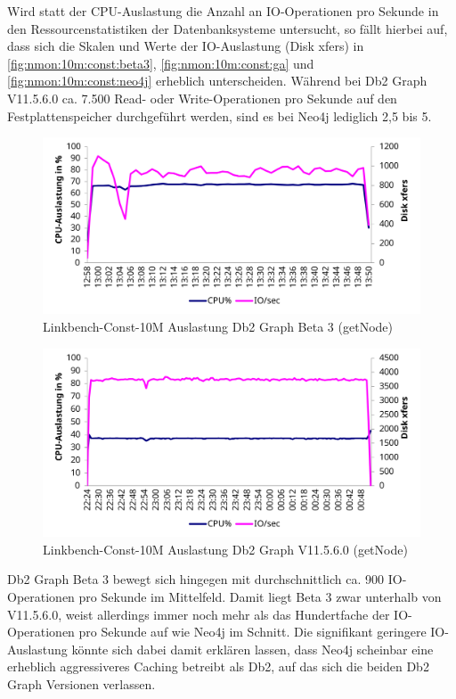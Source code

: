 Wird statt der CPU-Auslastung die Anzahl an IO-Ope\-ra\-ti\-on\-en pro Sekunde in den Ressourcenstatistiken der Datenbanksysteme untersucht, so fällt hierbei auf, dass sich die Skalen und Werte der IO-Aus\-last\-ung (Disk xfers) in \autoref{fig:nmon:10m:const:beta3}, \autoref{fig:nmon:10m:const:ga} und \autoref{fig:nmon:10m:const:neo4j} erheblich unterscheiden. Während bei Db2 Graph V11.5.6.0 ca. 7.500 Read- oder Write-Ope\-ra\-ti\-on\-en pro Sekunde auf den Festplattenspeicher durchgeführt werden, sind es bei Neo4j lediglich 2,5 bis 5. 
\begin{figure}[!ht]
    \centering
    \includegraphics[width=\textwidth]{images/stats/linkbench-10m-const_beta3.pdf}
    \caption{Linkbench-Const-10M Auslastung Db2 Graph Beta 3 (getNode)}
    \label{fig:nmon:10m:const:beta3}
\end{figure}

\begin{figure}[!ht]
    \centering
    \includegraphics[width=\textwidth]{images/stats/linkbench-10m-const_ga.pdf}
    \caption{Linkbench-Const-10M Auslastung Db2 Graph V11.5.6.0 (getNode)}
    \label{fig:nmon:10m:const:ga}
\end{figure}

Db2 Graph Beta 3 bewegt sich hingegen mit durchschnittlich ca. 900 IO-Ope\-ra\-ti\-on\-en pro Sekunde im Mittelfeld. Damit liegt Beta 3 zwar unterhalb von V11.5.6.0, weist allerdings immer noch mehr als das Hundertfache der IO-Ope\-ra\-ti\-on\-en pro Sekunde auf wie Neo4j im Schnitt. Die signifikant geringere IO-Aus\-last\-ung könnte sich dabei damit erklären lassen, dass Neo4j scheinbar eine erheblich aggressiveres Caching betreibt als Db2, auf das sich die beiden Db2 Graph Versionen verlassen. 

